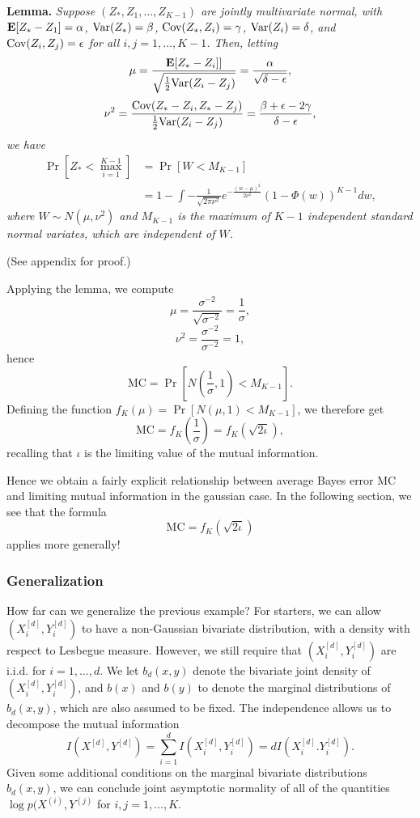 \documentclass[12pt]{article}
\begin{document}
\textbf{Lemma. }
\emph{
Suppose $(Z_*, Z_1, \hdots, Z_{K-1})$ are jointly multivariate normal, with 
$\textbf{E}[Z_* - Z_1]= \alpha$, 
$\text{Var}(Z_*) = \beta$, 
$\text{Cov}(Z_*, Z_i) = \gamma$, 
$\text{Var}(Z_i)= \delta$, and $\text{Cov}(Z_i, Z_j) = \epsilon$ for all $i, j = 1, \hdots,
K-1$.  Then, letting
\[
\mu = \frac{\textbf{E}[Z_* - Z_i]]}{\sqrt{\frac{1}{2}\text{Var}(Z_i - Z_j)}} = \frac{\alpha}{\sqrt{\delta - \epsilon}},
\]
\[
\nu^2 = \frac{\text{Cov}(Z_* -Z_i, Z_* - Z_j)}{\frac{1}{2}\text{Var}(Z_i - Z_j)} = \frac{\beta + \epsilon - 2\gamma}{\delta - \epsilon},
\]
we have
\begin{align*}
\Pr[Z_* < \max_{i=1}^{K-1}] &= \Pr[W < M_{K-1}]
\\&= 1 - \int -\frac{1}{\sqrt{2\pi\nu^2}} e^{-\frac{(w-\mu)^2}{2\nu^2}} (1-\Phi(w))^{K-1} dw,
\end{align*}
where $W \sim N(\mu, \nu^2)$ and $M_{K-1}$ is the maximum of $K-1$
independent standard normal variates, which are independent of $W$.
}

(See appendix for proof.)

Applying the lemma, we compute
\[
\mu = \frac{\sigma^{-2}}{\sqrt{\sigma^{-2}}} = \frac{1}{\sigma},
\]
\[
\nu^2 = \frac{\sigma^{-2}}{\sigma^{-2}} = 1,
\]
hence
\[
\text{MC} = \Pr[N(\frac{1}{\sigma}, 1) < M_{K-1}].
\]
Defining the function $f_K(\mu) = \Pr[N(\mu, 1) < M_{K-1}]$,
we therefore get
\[
\text{MC} = f_K\left(\frac{1}{\sigma}\right) = f_K(\sqrt{2 \iota}),
\]
recalling that $\iota$ is the limiting value of the mutual information.

Hence we obtain a fairly explicit relationship between average Bayes
error $\text{MC}$ and limiting mutual information in the gaussian
case.  In the following section, we see that the formula
\[
\text{MC} = f_K(\sqrt{2\iota})
\]
applies more generally!

\subsubsection{Generalization}

How far can we generalize the previous example?  For starters, we can
allow $(X_i^{[d]}, Y_i^{[d]})$ to have a non-Gaussian bivariate
distribution, with a density with respect to Lesbegue measure.
However, we still require that $(X_i^{[d]}, Y_i^{[d]})$ are i.i.d. for
$i = 1,\hdots, d$.  We let $b_d(x, y)$ denote the bivariate joint
density of $(X_i^{[d]}, Y_i^{[d]})$, and $b(x)$ and $b(y)$ to denote
the marginal distributions of $b_d(x, y)$, which are also assumed to
be fixed.  The independence allows us to decompose the mutual
information
\[
I(X^{[d]}, Y^{[d]}) = \sum_{i=1}^d I(X_i^{[d]}, Y_i^{[d]}) = d I(X_i^{[d]}. Y_i^{[d]}).
\]
Given some additional conditions on the marginal bivariate
distributions $b_d(x, y)$, we can conclude joint asymptotic normality
of all of the quantities $\log p(X^{(i)}, Y^{(j)}$ for $i, j =
1,\hdots, K$.
\end{document}
